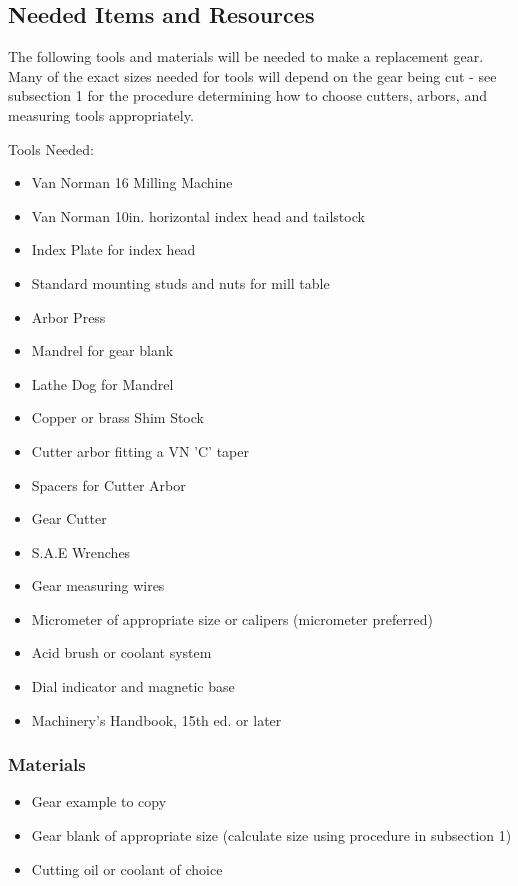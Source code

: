 \documentclass[12pt,twoside,letterpaper]{article}
\begin{document}
\subsection{ Needed Items and Resources}

The following tools and materials will be needed to make a replacement gear. Many of the exact sizes needed for tools will depend on the gear being cut - see subsection 1 for the procedure determining how to choose cutters, arbors, and measuring tools appropriately.

Tools Needed: 

\begin{itemize}
\item Van Norman 16 Milling Machine
\item Van Norman 10in. horizontal index head and tailstock
\item Index Plate for index head
\item Standard mounting studs and nuts for mill table
\item Arbor Press
\item Mandrel for gear blank
\item Lathe Dog for Mandrel
\item Copper or brass Shim Stock
\item Cutter arbor fitting a VN 'C' taper
\item Spacers for Cutter Arbor
\item Gear Cutter
\item S.A.E Wrenches
\item Gear measuring wires
\item Micrometer of appropriate size or calipers (micrometer preferred)
\item Acid brush or coolant system
\item Dial indicator and magnetic base
\item Machinery's Handbook, 15th ed. or later
\end{itemize}


\subsubsection{Materials}

\begin{itemize}
\item Gear example to copy
\item Gear blank of appropriate size (calculate size using procedure in subsection 1)
\item Cutting oil or coolant of choice
\end{itemize}
\end{document}
